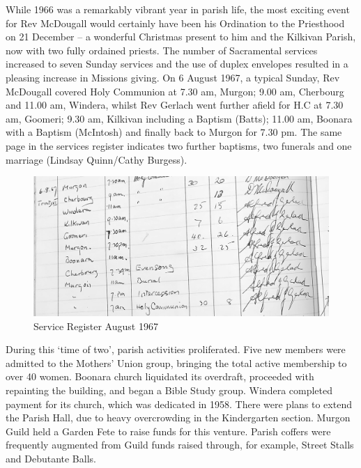 While 1966 was a remarkably vibrant year in parish life, the most exciting event for Rev McDougall would certainly have been his Ordination to the Priesthood on 21 December -- a wonderful Christmas present to him and the Kilkivan Parish, now with two fully ordained priests. The number of Sacramental services increased to seven Sunday services and the use of duplex envelopes resulted in a pleasing increase in Missions giving. On 6 August 1967, a typical Sunday, Rev McDougall covered Holy Communion at 7.30 am, Murgon; 9.00 am, Cherbourg and 11.00 am, Windera, whilst Rev Gerlach went further afield for H.C at 7.30 am, Goomeri; 9.30 am, Kilkivan including a Baptism (Batts); 11.00 am, Boonara with a Baptism (McIntosh) and finally back to Murgon for 7.30 pm. The same page in the services register indicates two further baptisms, two funerals and one marriage (Lindsay Quinn/Cathy Burgess).









\begin{figure}[!htb]
\begin{center}
\includegraphics[width=1.\textwidth,center]{../images/serviceRegisterAug1967.jpg}
\caption{Service Register August 1967}
\end{center}
\end{figure}




During this `time of two', parish activities proliferated. Five new members were admitted to the Mothers' Union group, bringing the total active membership to over 40 women. Boonara church liquidated its overdraft, proceeded with repainting the building, and began a Bible Study group. Windera completed payment for its church, which was dedicated in 1958. There were plans to extend the Parish Hall, due to heavy overcrowding in the Kindergarten section. Murgon Guild held a Garden Fete to raise funds for this venture. Parish coffers were frequently augmented from Guild funds raised through, for example, Street Stalls and Debutante Balls.



